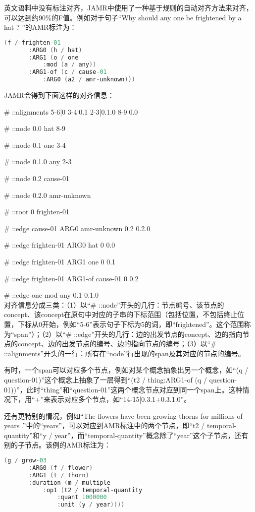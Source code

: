 \documentclass[master, winfont]{njuthesis}
\begin{document}
英文语料中没有标注对齐，JAMR中使用了一种基于规则的自动对齐方法来对齐，可以达到约90\%的F值\cite{Flanigan2014}。例如对于句子“Why should any one be frightened by a hat ? ”的AMR标注为：
\begin{lstlisting}[language=C]
   (f / frighten-01
       :ARG0 (h / hat)
       :ARG1 (o / one
           :mod (a / any))
       :ARG1-of (c / cause-01
           :ARG0 (a2 / amr-unknown)))
\end{lstlisting}

JAMR会得到下面这样的对齐信息：\par
\# ::alignments 5-6|0 3-4|0.1 2-3|0.1.0 8-9|0.0 \par
\# ::node	0.0	hat	8-9  \par
\# ::node	0.1	one	3-4  \par
\# ::node	0.1.0	any	2-3  \par
\# ::node	0.2	cause-01	  \par
\# ::node	0.2.0	amr-unknown  \par	
\# ::root	0	frighten-01 \par
\# ::edge	cause-01	ARG0	amr-unknown	0.2	0.2.0	\par
\# ::edge	frighten-01	ARG0	hat	0	0.0	 \par
\# ::edge	frighten-01	ARG1	one	0	0.1	 \par
\# ::edge	frighten-01	ARG1-of	cause-01	0	0.2	 \par
\# ::edge	one	mod	any	0.1	0.1.0	 \\

对齐信息分成三类：（1）以“\# ::node”开头的几行：节点编号、该节点的concept、该concept在原句中对应的子串的下标范围（包括位置，不包括终止位置，下标从0开始，例如“5-6”表示句子下标为5的词，即“frightened”。这个范围称为“span”）；（2）以“\# ::edge”开头的几行：边的出发节点的concept、边的指向节点的concept、边的出发节点的编号、边的指向节点的编号；（3）以“\# ::alignments”开头的一行：所有在“node”行出现的span及其对应的节点的编号。

有时，一个span可以对应多个节点，例如对某个概念抽象出另一个概念，如“(q / question-01)”这个概念上抽象了一层得到“(t2 / thing:ARG1-of (q / question-01))”，此时“thing”和“question-01”这两个概念节点对应到同一个span上。这种情况下，用“+”来表示对应多个节点，如“14-15|0.3.1+0.3.1.0”。

还有更特别的情况，例如“The flowers have been growing thorns for millions of years .”中的“years”，可以对应到AMR标注中的两个节点，即“t2 / temporal-quantity”和“y / year”，而“temporal-quantity”概念除了“year”这个子节点，还有别的子节点。该例的AMR标注为：
\begin{lstlisting}[language=C]
   (g / grow-03
       :ARG0 (f / flower)
       :ARG1 (t / thorn)
       :duration (m / multiple
           :op1 (t2 / temporal-quantity
               :quant 1000000
               :unit (y / year))))
\end{lstlisting}
                        
\end{document}
